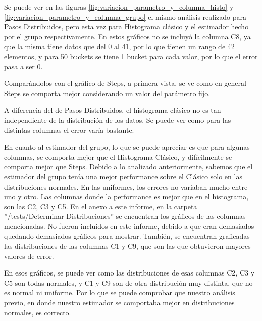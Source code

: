 	Se puede ver en las figuras \ref{fig:variacion_parametro_y_columna_histo} y \ref{fig:variacion_parametro_y_columna_grupo} el mismo an\'alisis realizado para Pasos Distribuidos, pero esta vez para Histograma cl\'asico y el estimador hecho por el grupo respectivamente. En estos gr\'aficos no se incluy\'o la columna C8, ya que la misma tiene datos que del 0 al 41, por lo que tienen un rango de 42 elementos, y para 50 buckets se tiene 1 bucket para cada valor, por lo que el error pasa a ser 0.

	Compar\'andolos con el gr\'afico de Steps, a primera vista, se ve como en general Steps se comporta mejor considerando un valor del par\'ametro fijo. 
	
	A diferencia del de Pasos Distribuidos, el histograma cl\'asico no es tan independiente de la distribuci\'on de los datos. Se puede ver como para las distintas columnas el error var\'ia bastante.
	
	En cuanto al estimador del grupo, lo que se puede apreciar es que para algunas columnas, se comporta mejor que el Histograma Cl\'asico, y dif\'icilmente se comporta mejor que Steps. Debido a lo analizado anteriormente, sabemos que el estimador del grupo ten\'ia una mejor performance sobre el Cl\'asico solo en las distribuciones normales. En las uniformes, los errores no variaban mucho entre uno y otro. Las columnas donde la performance es mejor que en el histograma, son las C2, C3 y C5. En el anexo a este informe, en la carpeta ''/tests/Determinar Distribuciones'' se encuentran los gr\'aficos de las columnas mencionadas. No fueron incluidos en este informe, debido a que eran demasiados quedando demasiados gr\'aficos para mostrar. Tambi\'en, se encuentran graficadas las distribuciones de las columnas C1 y C9, que son las que obtuvieron mayores valores de error.
	
	En esos gr\'aficos, se puede ver como las distribuciones de esas columnas C2, C3 y C5 son todas normales, y C1 y C9 son de otra distribuci\'on muy distinta, que no es normal ni uniforme. Por lo que se puede comprobar que nuestro an\'alisis previo, en donde nuestro estimador se comportaba mejor en distribuciones normales, es correcto.